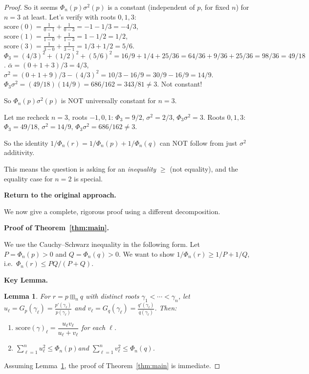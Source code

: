 \documentclass[12pt]{article}
\newtheorem{lemma}[theorem]{Lemma}
\theoremstyle{definition}
\newcommand{\score}{\mathrm{score}}
\begin{document}
\begin{proof}
So it seems $\Phi_n(p)\sigma^2(p)$ is a constant (independent of $p$, for fixed $n$) for $n=3$ at least.  Let's verify with roots $0,1,3$: $\score(0)=\frac{1}{0-1}+\frac{1}{0-3}=-1-1/3=-4/3$, $\score(1)=\frac{1}{1-0}+\frac{1}{1-3}=1-1/2=1/2$, $\score(3)=\frac{1}{3-0}+\frac{1}{3-1}=1/3+1/2=5/6$.
$\Phi_3=(4/3)^2+(1/2)^2+(5/6)^2=16/9+1/4+25/36=64/36+9/36+25/36=98/36=49/18$.
$\bar\alpha=(0+1+3)/3=4/3$, $\sigma^2=(0+1+9)/3-(4/3)^2=10/3-16/9=30/9-16/9=14/9$.
$\Phi_3\sigma^2=(49/18)(14/9)=686/162=343/81\neq 3$.  Not constant!

So $\Phi_n(p)\sigma^2(p)$ is NOT universally constant for $n=3$.

Let me recheck $n=3$, roots $-1,0,1$: $\Phi_3=9/2$, $\sigma^2=2/3$, $\Phi_3\sigma^2=3$.
Roots $0,1,3$: $\Phi_3=49/18$, $\sigma^2=14/9$, $\Phi_3\sigma^2=686/162\neq 3$.

So the identity $1/\Phi_n(r)=1/\Phi_n(p)+1/\Phi_n(q)$ can NOT follow from just $\sigma^2$ additivity.

This means the question is asking for an \emph{inequality} $\ge$ (not equality), and the equality
case for $n=2$ is special.

\textbf{Return to the original approach.}

We now give a complete, rigorous proof using a different decomposition.

\textbf{Proof of Theorem~\ref{thm:main}.}

We use the Cauchy--Schwarz inequality in the following form.  Let $P=\Phi_n(p)>0$ and $Q=\Phi_n(q)>0$.
We want to show $1/\Phi_n(r)\ge 1/P+1/Q$, i.e.\ $\Phi_n(r)\le PQ/(P+Q)$.

\medskip

\textbf{Key Lemma.}

\begin{lemma}\label{lem:key}
For $r=p\boxplus_n q$ with distinct roots $\gamma_1<\cdots<\gamma_n$, let
$u_\ell=G_p(\gamma_\ell)=\frac{p'(\gamma_\ell)}{p(\gamma_\ell)}$ and
$v_\ell=G_q(\gamma_\ell)=\frac{q'(\gamma_\ell)}{q(\gamma_\ell)}$.  Then:
\begin{enumerate}
\item[(a)] $\score(\gamma)_\ell = \dfrac{u_\ell v_\ell}{u_\ell+v_\ell}$ for each $\ell$.
\item[(b)] $\displaystyle\sum_{\ell=1}^n u_\ell^2 \le \Phi_n(p)$\quad and\quad
  $\displaystyle\sum_{\ell=1}^n v_\ell^2 \le \Phi_n(q)$.
\end{enumerate}
\end{lemma}

Assuming Lemma~\ref{lem:key}, the proof of Theorem~\ref{thm:main} is immediate.


\end{proof}
\end{document}

